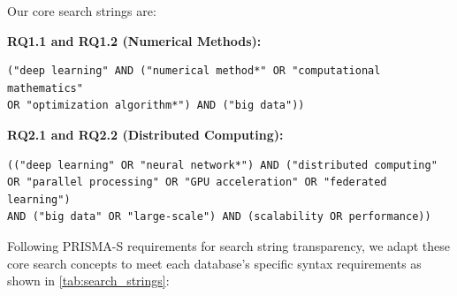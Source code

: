 \documentclass[acmsmall]{acmart}
\begin{document}
Our core search strings are:

\textbf{RQ1.1 and RQ1.2 (Numerical Methods):}
\begin{verbatim}
("deep learning" AND ("numerical method*" OR "computational mathematics" 
OR "optimization algorithm*") AND ("big data"))
\end{verbatim}

\textbf{RQ2.1 and RQ2.2 (Distributed Computing):}
\begin{verbatim}
(("deep learning" OR "neural network*") AND ("distributed computing" 
OR "parallel processing" OR "GPU acceleration" OR "federated learning") 
AND ("big data" OR "large-scale") AND (scalability OR performance))
\end{verbatim}

Following PRISMA-S requirements for search string transparency, we adapt these core search concepts to meet each database's specific syntax requirements as shown in \cref{tab:search_strings}:
\end{document}
